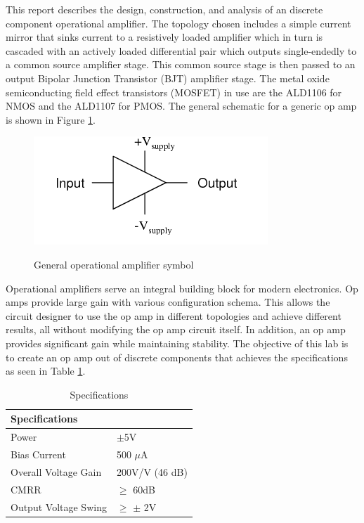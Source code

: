 



This report describes the design, construction, and analysis of an discrete component operational amplifier. The topology chosen includes a simple current mirror that sinks current to a resistively loaded amplifier which in turn is cascaded with an actively loaded differential pair which outputs single-endedly to a common source amplifier stage. This common source stage is then passed to an output Bipolar Junction Transistor (BJT) amplifier stage. The metal oxide semiconducting field effect transistors (MOSFET) in use are the ALD1106 for NMOS and the ALD1107 for PMOS. The general schematic for a generic op amp is shown in Figure \ref{fig:gen_schem}.

\begin{figure}[H]
    \begin{center}
    \includegraphics[scale=.45]{Introduction/genericopamp.png}
    \caption{General operational amplifier symbol \cite{b1}}
    \cite{b1}
    \label{fig:gen_schem}
    \end{center}
    
\end{figure}
Operational amplifiers serve an integral building block for modern electronics. Op amps provide large gain with various configuration schema. This allows the circuit designer to use the op amp in different topologies and achieve different results, all without modifying the op amp circuit itself. In addition, an op amp provides significant gain while maintaining stability. The objective of this lab is to create an op amp out of discrete components that achieves the specifications as seen in Table \ref{tab:labspecs}.


\begin{table}[H]
\centering
\caption{Specifications}
\label{tab:labspecs}
\begin{tabular}{|l|l|}
\hline
\textbf{Specifications} &                 \\ \hline
Power                   & $\pm$5V         \\ \hline
Bias Current            & 500 $\mu$A      \\ \hline
Overall Voltage Gain    & 200V/V (46 dB)  \\ \hline
CMRR                    & $\geq$ 60dB     \\ \hline
Output Voltage Swing    & $\geq$ $\pm$ 2V \\ \hline
\end{tabular}
\end{table}

